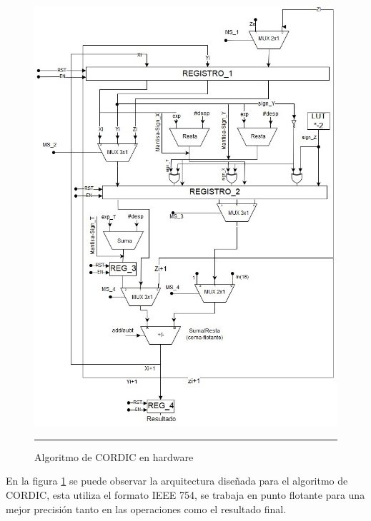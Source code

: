 \begin{figure}[H]
  \centering
    \includegraphics[scale=0.6]{./CORDICLN.jpg}
    \rule{35em}{0.5pt}
  \caption[Algoritmo de CORDIC en hardware]{Algoritmo de CORDIC en hardware  }
  \label{fig:CORDICLN}
\end{figure}

En la figura \ref{fig:CORDICLN} se puede observar la arquitectura diseñada para el algoritmo de CORDIC, esta utiliza el formato IEEE 754, se trabaja en punto flotante para una mejor precisión tanto en las operaciones como el resultado final. 

